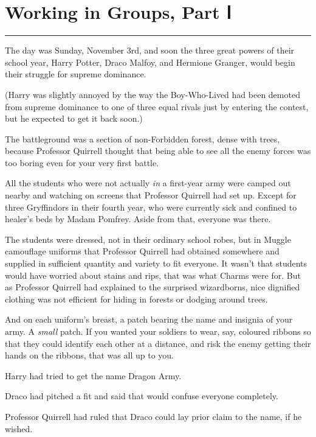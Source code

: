 \chapter{Working in Groups, Part Ⅰ}

\begin{center}\rule{3in}{0.4pt}\end{center}

The day was Sunday, November 3rd, and soon the three great powers of
their school year, Harry Potter, Draco Malfoy, and Hermione Granger,
would begin their struggle for supreme dominance.

(Harry was slightly annoyed by the way the Boy-Who-Lived had been
demoted from supreme dominance to one of three equal rivals just by
entering the contest, but he expected to get it back soon.)

The battleground was a section of non-Forbidden forest, dense with
trees, because Professor Quirrell thought that being able to see all the
enemy forces was too boring even for your very first battle.

All the students who were not actually \emph{in} a first-year army were
camped out nearby and watching on screens that Professor Quirrell had
set up. Except for three Gryffindors in their fourth year, who were
currently sick and confined to healer's beds by Madam Pomfrey. Aside
from that, everyone was there.

The students were dressed, not in their ordinary school robes, but in
Muggle camouflage uniforms that Professor Quirrell had obtained
somewhere and supplied in sufficient quantity and variety to fit
everyone. It wasn't that students would have worried about stains and
rips, that was what Charms were for. But as Professor Quirrell had
explained to the surprised wizardborns, nice dignified clothing was not
efficient for hiding in forests or dodging around trees.

And on each uniform's breast, a patch bearing the name and insignia of
your army. A \emph{small} patch. If you wanted your soldiers to wear,
say, coloured ribbons so that they could identify each other at a
distance, and risk the enemy getting their hands on the ribbons, that
was all up to you.

Harry had tried to get the name Dragon Army.

Draco had pitched a fit and said that would confuse everyone completely.

Professor Quirrell had ruled that Draco could lay prior claim to the
name, if he wished.

